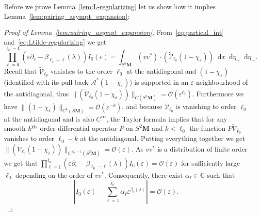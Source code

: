\documentclass[AHL, Unicode, longabstracts, published]{cedram}
\newcommand{\mc}{\mathcal}
\newcommand{\cc}{\mathbb{C}}
\newcommand{\bfm}{\mathbf{M}}
\newcommand{\til}{\widetilde}
\newcommand{\intd}{\mathop{}\!\mathrm{d}}
\begin{document}
Before we prove Lemma~\ref{lem:L-regularizing} let us show how it implies Lemma~\ref{lem:pairing_asympt_expansion}:
\begin{proof}[Proof of Lemma~\ref{lem:pairing_asympt_expansion}]
From~\eqref{eq:partical_int} and~\eqref{eq:Ltilde-regularizing} we get
\[
\prod_{\ell=0}^{\ell_0-1} (\varepsilon\partial_\varepsilon - \beta_{\ell_0-\ell}(\lambda))I_0(\varepsilon) = \int_{S^2\mathbf M} (vv^*) \cdot \left(\til{\mathcal V}_{\ell_0}(1-\chi_\varepsilon)\right)
\intd x\intd\eta_-\intd\eta_+.
\]
Recall that $\til{\mathcal V}_{\ell_0}$ vanishes to the order $\ell_0$ at the antidiagonal and $(1-\chi_\varepsilon)$ (identified with its pull-back $\mc{A}^*(1-\chi_\varepsilon)$) is supported in an $\varepsilon$-neighbourhood of the antidiagonal, thus $\|(\til{\mathcal V}_{\ell_0}(1-\chi_\varepsilon))\|_{C(S^2{\bfm})} = \mc{O}(\varepsilon^{\ell_0})$. Furthermore we have $\|(1-\chi_\varepsilon)\|_{C^k(S{\bfm})} =\mathcal O(\varepsilon^{-k})$, and because $\til{\mathcal V}_{\ell_0}$ is vanishing to order $\ell_0$ at the antidiagonal and is also $C^\infty$, the Taylor formula implies that for any smooth $k^{\rm th}$ order differential operator $P$ on $S^2{\bfm}$ and $k<\ell_0$ the function $P\til{\mathcal V}_{\ell_0}$ vanishes to order $\ell_0-k$ at the antidiagonal. Putting everything together we get $\|(\til{\mathcal V}_{\ell_0}(1-\chi_\varepsilon))\|_{C^{\ell_0 - 1}(S^2{\bfm})} = \mc{O}(\varepsilon)$. As $vv^*$ is a distribution of finite order we get that $\prod_{\ell=1}^{\ell_0} (\varepsilon\partial_\varepsilon - \beta_{\ell_0-\ell}(\lambda))I_0(\varepsilon) = \mc{O}(\varepsilon)$ for sufficiently large $\ell_0$ depending on the order of $vv^*$. Consequently, there exist $\alpha_\ell\in\cc$ such that
\[
\left|I_0(\varepsilon) - \sum_{\ell=1}^{\ell_0} \alpha_\ell \varepsilon^{\beta_\ell(\lambda)}\right| = \mc{O}(\varepsilon).
\]


\end{proof}
\end{document}
